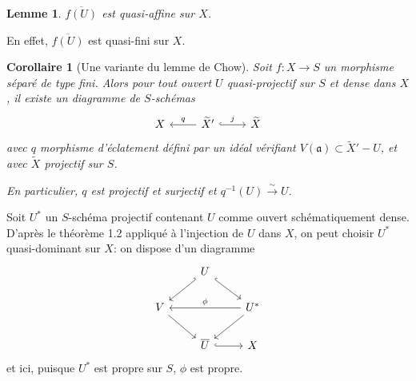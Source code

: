 \documentclass[11pt,a4paper]{article}
\theoremstyle{plain}
\newtheorem{lemma}[theorem]{Lemme}
\newtheorem{corollary}[theorem]{Corollaire}
\theoremstyle{definition}
\begin{document}
\begin{lemma}
$\overline{f(U)}$ est quasi-affine sur $X$.
\end{lemma}

En effet, $\overline{f(U)}$ est quasi-fini sur $X$.

\begin{corollary}[Une variante du lemme de Chow]
Soit $f: X \to S$ un morphisme s\'epar\'e de type fini. Alors pour tout ouvert $U$ quasi-projectif sur $S$ et dense dans $X$, il existe un diagramme de $S$-sch\'emas
\[
\begin{tikzcd}
X & \widetilde{X}' \arrow[l, "q"'] \arrow[r, hook, "j"] & \widetilde{X}
\end{tikzcd}
\]
avec $q$ morphisme d'\'eclatement d\'efini par un id\'eal v\'erifiant $V(\mathfrak{a}) \subset \widetilde{X}' - U$, et avec $\widetilde{X}$ projectif sur $S$.

En particulier, $q$ est projectif et surjectif et $q^{-1}(U) \xrightarrow{\sim} U$.
\end{corollary}

Soit $U^*$ un $S$-sch\'ema projectif contenant $U$ comme ouvert sch\'ematiquement dense. D'apr\`es le th\'eor\`eme 1.2 appliqu\'e \`a l'injection de $U$ dans $X$, on peut choisir $U^*$ quasi-dominant sur $X$: on dispose d'un diagramme
\begin{equation}\label{eq:1.4.1}
\begin{tikzcd}
& U \arrow[dl, hook'] \arrow[dr, hook] \\
V \arrow[dr] & & U^* \arrow[ll, "\phi"'] \arrow[dl] \\
& \overline{U} \arrow[r, hook] & X
\end{tikzcd}
\end{equation}
et ici, puisque $U^*$ est propre sur $S$, $\phi$ est propre.
\end{document}
